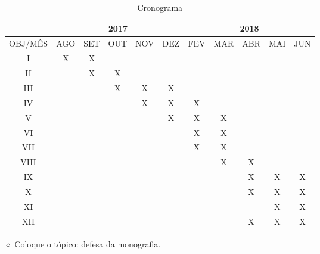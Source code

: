 \documentclass[
	12pt,				%
	openright,			%
	oneside,			%
	a4paper,			%
	english,			%
	french,				%
	spanish,			%
	brazil,				%
	]{abntex2}
\newcommand{\danielobs}[1]{{\color{red} $\diamond$ #1}}
\begin{document}
\begin{table}[h!]
	\centering
	\caption{Cronograma}
	\label{my-label}
	\begin{tabular}{c|c|c|c|c|c|c|c|c|c|c|}
		\cline{2-11}
		& \multicolumn{5}{c|}{2017}   & \multicolumn{5}{c|}{2018}   \\ \hline
		\multicolumn{1}{|c|}{OBJ/MÊS} & AGO & SET & OUT & NOV & DEZ & FEV & MAR & ABR & MAI & JUN \\ \hline
		\multicolumn{1}{|c|}{I}		&X&X& & & & & & & &\\ \hline
		\multicolumn{1}{|c|}{II}	& &X&X& & & & & & &\\ \hline
		\multicolumn{1}{|c|}{III}	& & &X&X&X& & & & &\\ \hline
		\multicolumn{1}{|c|}{IV}	& & & &X&X&X& & & &\\ \hline
		\multicolumn{1}{|c|}{V}		& & & & &X&X&X& & &\\ \hline
		\multicolumn{1}{|c|}{VI}	& & & & & &X&X& & &\\ \hline
		\multicolumn{1}{|c|}{VII}	& & & & & &X&X& & &\\ \hline
		\multicolumn{1}{|c|}{VIII}	& & & & & & &X&X& &\\ \hline
		\multicolumn{1}{|c|}{IX}	& & & & & & & &X&X&X\\ \hline
		\multicolumn{1}{|c|}{X}		& & & & & & & &X&X&X\\ \hline
		\multicolumn{1}{|c|}{XI}	& & & & & & & & &X&X\\ \hline
		\multicolumn{1}{|c|}{XII}	& & & & & & & &X&X&X\\ \hline
	\end{tabular}
\end{table}

	\danielobs{Coloque o tópico: defesa da monografia.}


\end{document}
